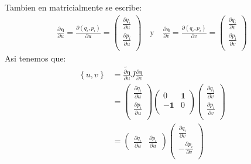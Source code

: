 \documentclass[a4paper]{article}
\begin{document}
\begin{answer}[punto 21]
        Tambien en matricialmente se escribe: 
        \begin{align*}
            \frac{\partial \pmb \eta}{\partial u} = \frac {\partial (q_i, p_i)}{\partial u} = \begin{pmatrix}
                \frac{\partial q_i}{\partial u} \\
                \frac{\partial p_i}{\partial u} \\
            \end{pmatrix} \quad \text{y} \quad \frac{\partial \pmb \eta}{\partial v} = \frac {\partial (q_i, p_i)}{\partial v} = \begin{pmatrix}
                \frac{\partial q_i}{\partial v} \\
                \frac{\partial p_i}{\partial v} \\
            \end{pmatrix}
        \end{align*}
        Asi tenemos que:
        \begin{align*}
            \left\{u,v\right\} &= \tilde{\frac{\partial \pmb \eta}{\partial u}} J {\frac{\partial \pmb \eta}{\partial v}}\\
            &= \begin{pmatrix}
                \frac{\partial q_i}{\partial u} \\
                \frac{\partial p_i}{\partial u} \\
            \end{pmatrix}
            \begin{pmatrix}
                0 & \mathbf 1\\
                -\mathbf 1 & 0\\
            \end{pmatrix}
            \begin{pmatrix}
                \frac{\partial q_i}{\partial v} \\
                \frac{\partial p_i}{\partial v} \\
            \end{pmatrix}\\
            &= \begin{pmatrix}
                \frac{\partial q_i}{\partial u} &
                \frac{\partial p_i}{\partial u}
            \end{pmatrix}
            \begin{pmatrix}
                \frac{\partial q_i}{\partial v} \\
                -\frac{\partial p_i}{\partial v} \\

\end{pmatrix}
\end{align*}
\end{answer}
\end{document}
